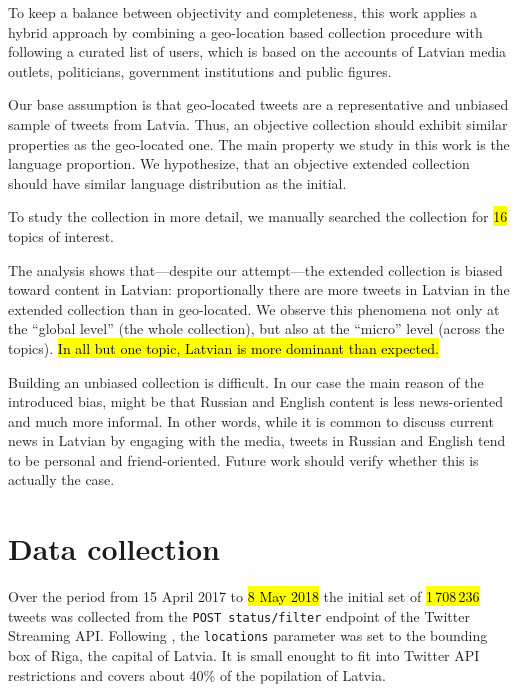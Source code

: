 \documentclass{IOS-Book-Article}
\begin{document}
To keep a balance between objectivity and completeness, this work applies a hybrid approach by combining a geo-location based collection procedure with following a curated list of users, which is based on the accounts of Latvian media outlets, politicians, government institutions and public figures.

Our base assumption is that geo-located tweets are a representative and unbiased sample of tweets from Latvia. Thus, an objective collection should exhibit similar properties as the geo-located one. The main property we study in this work is the language proportion. We hypothesize, that an objective extended collection should have similar language distribution as the initial.

To study the collection in more detail, we manually searched the collection for \hl{16} topics of interest.


The analysis shows that---despite our attempt---the extended collection is biased toward content in Latvian: proportionally there are more tweets in Latvian in the extended collection than in geo-located. We observe this phenomena not only at the ``global level'' (the whole collection), but also at the ``micro'' level (across the topics). \hl{In all but one topic, Latvian is more dominant than expected.}


Building an unbiased collection is difficult.  In our case the main reason of the introduced bias, might be that Russian and English content is less news-oriented and much more informal. In other words, while it is common to discuss current news in Latvian by engaging with the media, tweets in Russian and English tend to be personal and friend-oriented. Future work should verify whether this is actually the case.

\section{Data collection}
\label{sec:data-collection}

Over the period from 15 April 2017 to \hl{8 May 2018} the initial set of \hl{1\,708\,236} tweets was collected from the \texttt{POST status/filter} endpoint of the Twitter Streaming API. Following \cite{milajevs:2017:BUCC}, the \texttt{locations} parameter was set to the bounding box of Riga, the capital of Latvia. It is small enought to fit into Twitter API restrictions and covers about 40\% of the popilation of Latvia.%
%
\end{document}
